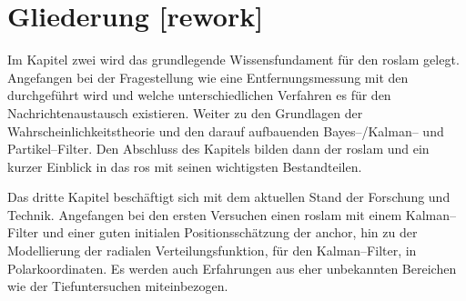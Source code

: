 \begin{comment}
------------------------------------------------------------------------------------------
- Die Vorgehensweise und die Wahl der Methode sollte begründet und dargelegt werden.
\end{comment}


\begin{comment}
------------------------------------------------------------------------------------------
- Wie ist die Bachelorarbeit aufgebaut?
- Was erwartet einen in den folgenden Kapitel/Abschnitten?
- Pro Kapitel einen Absatz.
- auf keinen Fall nur eine Wiederholung des Inhaltsverzeichnisses sein
- Wie bauen die Kapitel aufeinander auf? Dies muss erläutert und nicht nacherzählt werden.
- Überblick über den Aufbau der Bachelorarbeit: Wie bauen die einzelnen Kapitel aufeinander auf, welcher Argumentationslinie wird gefolgt; dieser sollte aber nie eine Nacherzählung der Inhaltsverzeichnisses sein!
- Schlussendlich gibst du dem Leser einen Gesamtüberblick über deine Bachelorarbeit, in dem du den Aufbau erläuterst, den roten Faden erkennen lässt und darstellst, wie die Forschungsfragen beantwortet werden.
\end{comment}
\section{Gliederung [rework]}

Im Kapitel zwei wird das grundlegende Wissensfundament für den \Gls{roslam} gelegt. Angefangen bei der Fragestellung wie eine Entfernungsmessung mit den  durchgeführt wird und welche unterschiedlichen Verfahren es für den Nachrichtenaustausch existieren. Weiter zu den Grundlagen der Wahrscheinlichkeitstheorie und den darauf aufbauenden Bayes--/Kalman-- und Partikel--Filter. Den Abschluss des Kapitels bilden dann der \Gls{roslam} und ein kurzer Einblick in das \Gls{ros} mit seinen wichtigsten Bestandteilen.

Das dritte Kapitel beschäftigt sich mit dem aktuellen Stand der Forschung und Technik. Angefangen bei den ersten Versuchen einen \Gls{roslam} mit einem Kalman--Filter und einer guten initialen Positionsschätzung der \Gls{anchor}, hin zu der Modellierung der radialen Verteilungsfunktion, für den Kalman--Filter, in Polarkoordinaten. Es werden auch Erfahrungen aus eher unbekannten Bereichen wie der Tiefuntersuchen miteinbezogen.

